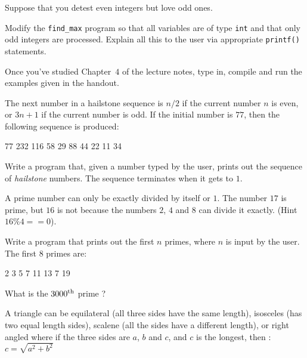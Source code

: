Suppose that you detest even integers but love odd ones.

\begin{exercise}
Modify the \verb^find_max^ program so that all variables
are of type \verb^int^ and that only odd integers are processed.
Explain all this to the user via appropriate \verb^printf()^ statements.
\end{exercise}

\begin{exercise}
Once you've studied Chapter~$4$ of the lecture notes, type in, compile and run
the examples given in the handout.
\end{exercise}

The next number in a hailstone sequence is $n/2$ if the current
number $n$ is even, or $3n+1$ if the current number is odd. If the
initial number is $77$, then the following sequence is produced:
\begin{terminaloutput}
77
232
116
58
29
88
44
22
11
34
\end{terminaloutput}

\begin{exercise}
Write a program that, given a number typed by the user,
prints out the sequence of {\em hailstone} numbers.
The sequence terminates when it gets to $1$.
\end{exercise}

A prime number can only be exactly divided by itself
or $1$. The number $17$ is prime, but $16$ is not because
the numbers $2$, $4$ and $8$ can divide it exactly.
(Hint~$16\%4 == 0$).
\begin{exercise}
Write a program that prints out the first $n$ primes, where
$n$ is input by the user. The first $8$ primes are:
\begin{terminaloutput}
2
3
5
7
11
13
7
19
\end{terminaloutput}
What is the $3000^{\rm th}$ prime ?
\end{exercise}


A triangle can be equilateral (all three sides have the same length),
isosceles (has two equal length sides), scalene
(all the sides have a different length), or 
right angled where if the three sides are $a$, $b$ and $c$,
and $c$ is the longest, then :
\begin{math}
c = \sqrt{a^2 + b^2}
\end{math}

